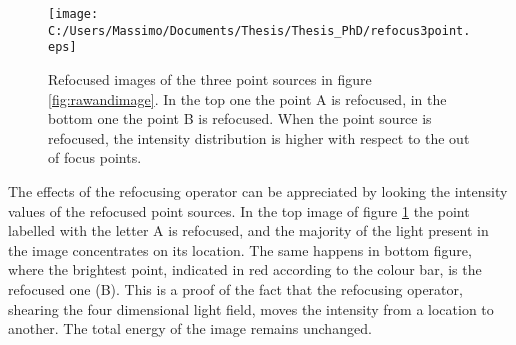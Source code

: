 \begin{figure}[H]
	\centering
	\texttt{[image: C:/Users/Massimo/Documents/Thesis/Thesis\_PhD/refocus3point.eps]}
	\caption{\label{fig:refocus} Refocused images of the three point sources in figure \ref{fig:rawandimage}. In the top one the point A is refocused, in the bottom one the point B is refocused. When the point source is refocused, the intensity distribution is higher with respect to the out of focus points. }
\end{figure}
The effects of the refocusing operator can be appreciated by looking the intensity values of the refocused point sources. In the top image of figure \ref{fig:refocus} the point labelled with the letter A is refocused, and the majority of the light present in the image concentrates on its location. The same happens in bottom figure, where the brightest point, indicated in red according to the colour bar, is the refocused one (B). This is a proof of the fact that the refocusing operator, shearing the four dimensional light field, moves the intensity from a location to another. The total energy of the image remains unchanged. 
\\

